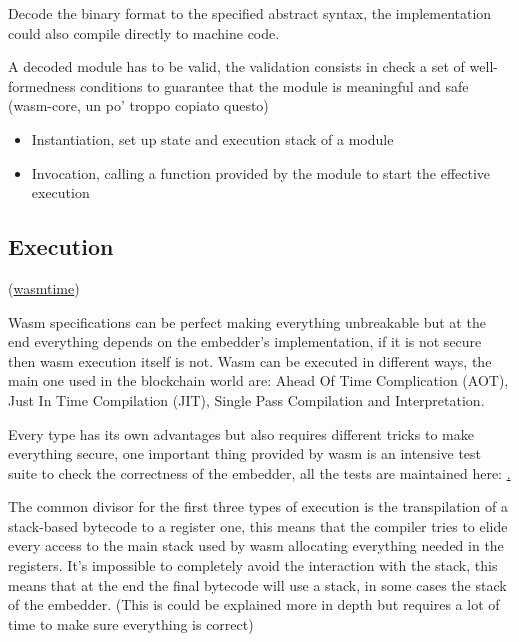 \documentclass[../main.tex]{subfiles}
\begin{document}
\begin{description} [style=nextline]
  \item[Decoding]
        Decode the binary format to the specified abstract syntax, the implementation could also compile directly to machine code.
  \item[Validation]
        A decoded module has to be valid, the validation consists in check a set of well-formedness conditions to guarantee that the module is meaningful and safe (wasm-core, un po' troppo copiato questo)
  \item[Execution]
        \begin{itemize}
          \item Instantiation, set up state and execution stack of a module
          \item Invocation, calling a function provided by the module to start the effective execution
        \end{itemize}
\end{description}

\subsection{Execution}
(\href{https://docs.wasmtime.dev/}{wasmtime})

Wasm specifications can be perfect making everything unbreakable but at the end everything depends on the embedder's implementation, if it is not secure then wasm execution itself is not. Wasm can be executed in different ways, the main one used in the blockchain world are: Ahead Of Time Complication (AOT), Just In Time Compilation (JIT), Single Pass Compilation and Interpretation.

Every type has its own advantages but also requires different tricks to make everything secure, one important thing provided by wasm is an intensive test suite to check the correctness of the embedder, all the tests are maintained here: \href{https://github.com/WebAssembly/spec/tree/main/test/core}.

The common divisor for the first three types of execution is the transpilation of a stack-based bytecode to a register one, this means that the compiler tries to elide every access to the main stack used by wasm allocating everything needed in the registers. It's impossible to completely avoid the interaction with the stack, this means that at the end the final bytecode will use a stack, in some cases the stack of the embedder. (This is could be explained more in depth but requires a lot of time to make sure everything is correct)
\end{document}
